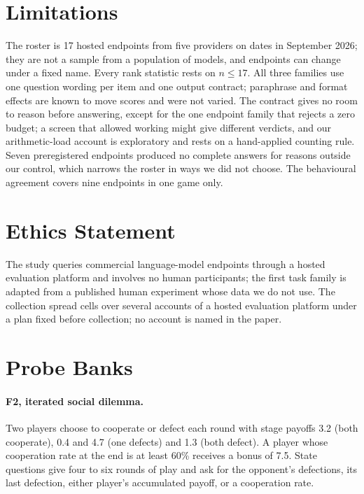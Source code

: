 \documentclass[11pt]{article}
\begin{document}
\section*{Limitations}

The roster is 17 hosted endpoints from five providers on dates in September
2026; they are not a sample from a population of models, and endpoints can
change under a fixed name. Every rank statistic rests on $n\le17$. All three
families use one question wording per item and one output contract; paraphrase
and format effects are known to move scores \citep{mizrahi2024state,sclar2024quantifying}
and were not varied. The contract gives no room to reason before answering,
except for the one endpoint family that rejects a zero budget; a screen that
allowed working might give different verdicts, and our arithmetic-load account
is exploratory and rests on a hand-applied counting rule. Seven preregistered
endpoints produced no complete answers for reasons outside our control, which
narrows the roster in ways we did not choose. The behavioural agreement covers
nine endpoints in one game only.

\section*{Ethics Statement}

The study queries commercial language-model endpoints through a hosted
evaluation platform and involves no human participants; the first task family
is adapted from a published human experiment whose data we do not use. The
collection spread cells over several accounts of a hosted evaluation platform
under a plan fixed before collection; no account is named in the paper.



\appendix

\section{Probe Banks}
\label{sec:app-banks}

\paragraph{F2, iterated social dilemma.} Two players choose to cooperate or
defect each round with stage payoffs 3.2 (both cooperate), 0.4 and 4.7 (one
defects) and 1.3 (both defect). A player whose cooperation rate at the end is at
least 60\% receives a bonus of 7.5. State questions give four to six rounds of
play and ask for the opponent's defections, its last defection, either
player's accumulated payoff, or a cooperation rate.
\end{document}
